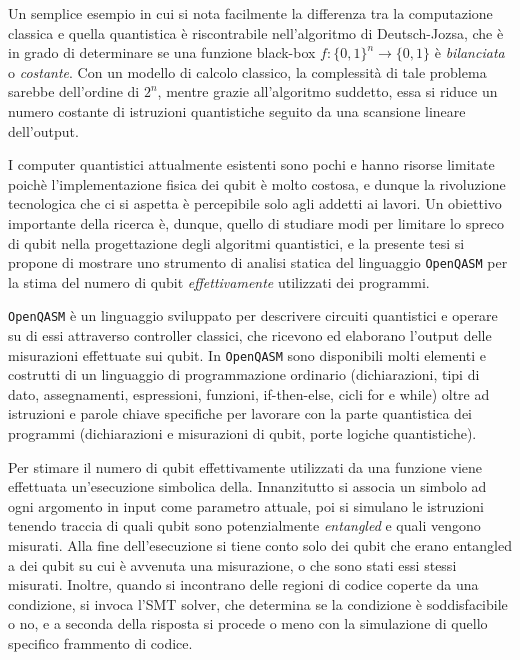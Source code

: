 \documentclass[12pt,a4paper]{report}
\theoremstyle{definition}
\theoremstyle{definition}
\theoremstyle{definition}
\begin{document}
Un semplice esempio in cui si nota facilmente la differenza tra la computazione classica e quella quantistica è riscontrabile nell'algoritmo di Deutsch-Jozsa, che è in grado di determinare se una funzione black-box $f: \{0,1\}^n \longrightarrow \{0,1\}$ è \emph{bilanciata} o \emph{costante}. Con un modello di calcolo classico, la complessità di tale problema sarebbe dell'ordine di $2^n$, mentre grazie all'algoritmo suddetto, essa si riduce un numero costante di istruzioni quantistiche seguito da una scansione lineare dell'output.

I computer quantistici attualmente esistenti sono pochi e hanno risorse limitate poichè l'implementazione fisica dei qubit è molto costosa, e dunque la rivoluzione tecnologica che ci si aspetta è percepibile solo agli addetti ai lavori. Un obiettivo importante della ricerca è, dunque, quello di studiare modi per limitare lo spreco di qubit nella progettazione degli algoritmi quantistici, e la presente tesi si propone di mostrare uno strumento di analisi statica del linguaggio \texttt{OpenQASM} per la stima del numero di qubit \emph{effettivamente} utilizzati dei programmi.

\texttt{OpenQASM} è un linguaggio sviluppato per descrivere circuiti quantistici e operare su di essi attraverso controller classici, che ricevono ed elaborano l'output delle misurazioni effettuate sui qubit. In \texttt{OpenQASM} sono disponibili molti elementi e costrutti di un linguaggio di programmazione ordinario (dichiarazioni, tipi di dato, assegnamenti, espressioni, funzioni, if-then-else, cicli for e while) oltre ad istruzioni e parole chiave specifiche per lavorare con la parte quantistica dei programmi (dichiarazioni e misurazioni di qubit, porte logiche quantistiche).

Per stimare il numero di qubit effettivamente utilizzati da una funzione viene effettuata un'esecuzione simbolica della. Innanzitutto si associa un simbolo ad ogni argomento in input come parametro attuale, poi si simulano le istruzioni tenendo traccia di quali qubit sono potenzialmente \textit{entangled} e quali vengono misurati. Alla fine dell'esecuzione si tiene conto solo dei qubit che erano entangled a dei qubit su cui è avvenuta una misurazione, o che sono stati essi stessi misurati. Inoltre, quando si incontrano delle regioni di codice coperte da una condizione, si invoca l'SMT solver, che determina se la condizione è soddisfacibile o no, e a seconda della risposta si procede o meno con la simulazione di quello specifico frammento di codice.
\end{document}
